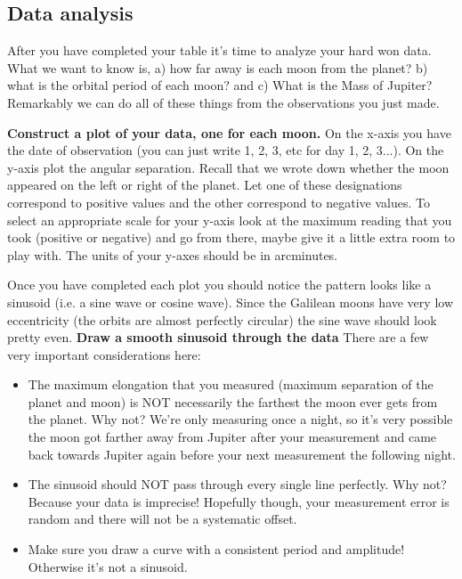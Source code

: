 \documentclass[12pt]{article}%
\begin{document}
\subsection*{Data analysis}
After you have completed your table it's time to analyze your hard won data. What we want to know is, a) how far away is each moon from the planet? b) what is the orbital period of each moon? and c) What is the Mass of Jupiter? Remarkably we can do all of these things from the observations you just made.

\textbf{Construct a plot of your data, one for each moon.} On the x-axis you have the date of observation (you can just write 1, 2, 3, etc for day 1, 2, 3...). On the y-axis plot the angular separation. Recall that we wrote down whether the moon appeared on the left or right of the planet. Let one of these designations correspond to positive values and the other correspond to negative values. To select an appropriate scale for your y-axis look at the maximum reading that you took (positive or negative) and go from there, maybe give it a little extra room to play with. The units of your y-axes should be in arcminutes.

Once you have completed each plot you should notice the pattern looks like a sinusoid (i.e. a sine wave or cosine wave). Since the Galilean moons have very low eccentricity (the orbits are almost perfectly circular) the sine wave should look pretty even.
\textbf{Draw a smooth sinusoid through the data} There are a few very important considerations here: 
\begin{itemize}
    \item The maximum elongation that you measured (maximum separation of the planet and moon) is NOT necessarily the farthest the moon ever gets from the planet. Why not? We're only measuring once a night, so it's very possible the moon got farther away from Jupiter after your measurement and came back towards Jupiter again before your next measurement the following night.
    \item The sinusoid should NOT pass through every single line perfectly. Why not? Because your data is imprecise! Hopefully though, your measurement error is random and there will not be a systematic offset.
    \item Make sure you draw a curve with a consistent period and amplitude!  Otherwise it's not a sinusoid.
\end{itemize}
\end{document}

